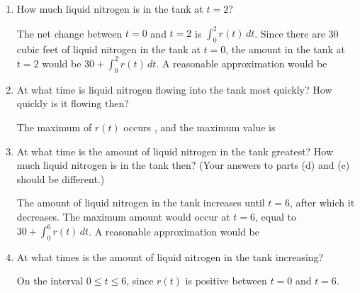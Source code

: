\documentclass{article}
\begin{document}
\begin{enumerate}
\begin{enumerate}
  \item
    \begin{problem}[\vfill]
      How much liquid nitrogen is in the tank at $t=2$?
    \end{problem}

    \begin{solution}
      The net change between $t=0$ and $t=2$ is $\int_0^2 r(t)\,dt$. Since
      there are 30 cubic feet of liquid nitrogen in the tank at $t=0$, 
      the amount in the tank at $t=2$ would be 
      $\boxed{30+\int_0^2 r(t)\,dt.}$ 
      A reasonable approximation would be 
    \end{solution}

  \item
    \begin{problem}[\vfill]
      At what time is liquid nitrogen flowing into the tank most quickly?
      How quickly is it flowing then?
    \end{problem}

    \begin{solution}
      The maximum of $r(t)$ occurs , and
      the maximum value is 
    \end{solution}

  \item
    \begin{problem}[\vfill\newpage]
      At what time is the amount of liquid nitrogen in the tank greatest?
      How much liquid nitrogen is in the tank then?
      (Your answers to parts (d) and (e) should be different.)
    \end{problem}

    \begin{solution}
      The amount of liquid nitrogen in the tank increases until $t=6$,
      after which it decreases. The maximum amount would occur at $t = 6$,
      equal to $\boxed{30+\int_0^6 r(t)\,dt}$. 
      A reasonable approximation would
      be 
    \end{solution}

  \item
    \begin{problem}[\vfill]
      At what times is the amount of liquid nitrogen in the tank
      increasing?
    \end{problem}

    \begin{solution}
      On the interval $\boxed{0 \leq t \leq 6}$, since $r(t)$ is positive
      between $t=0$ and $t=6$.
    \end{solution}


\end{enumerate}
\end{enumerate}
\end{document}
